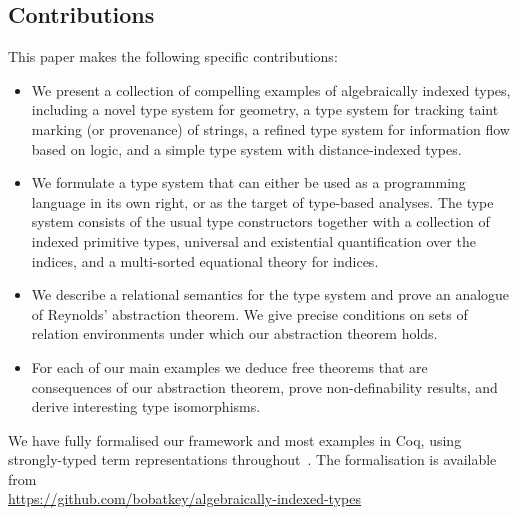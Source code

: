 
\subsection{Contributions}
\label{sec:contributions}

This paper makes the following specific contributions:
\begin{itemize}
\item 
We present a collection of compelling examples of algebraically
indexed types, including a novel type system for geometry, a type
system for tracking taint marking (or provenance) of strings, a
refined type system for information flow based on logic, and a simple
type system with distance-indexed types.
\item 
We formulate a type system that can either be used as a programming
language in its own right, or as the target of type-based
analyses. The type system consists of the usual type constructors
together with a collection of indexed primitive types, universal and
existential quantification over the indices, and a multi-sorted
equational theory for indices.
\item
We describe a relational semantics for the type system and prove an
analogue of Reynolds' abstraction theorem. We give precise conditions
on sets of relation environments under which our abstraction theorem
holds.
\item
For each of our main examples we deduce free theorems that are
consequences of our abstraction theorem, prove non-definability
results, and derive interesting type isomorphisms.
\end{itemize}
We have fully formalised our framework and most examples in Coq,
using strongly-typed term representations
throughout~\cite{TypedSyntax}. The formalisation is available from
\\{\small \url{https://github.com/bobatkey/algebraically-indexed-types}}



